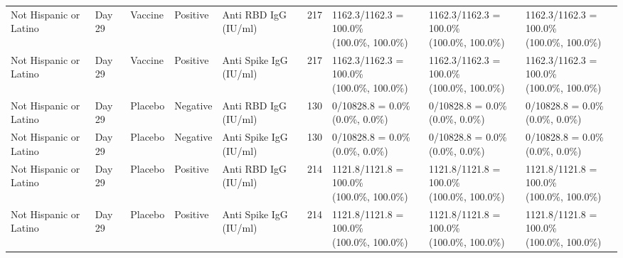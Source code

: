 \documentclass[]{book}
\theoremstyle{definition}
\theoremstyle{definition}
\theoremstyle{definition}
\newcommand{\1}{\mathbbm{1}}
\begin{document}
\begin{landscape}
\begin{ThreePartTable}
\begin{longtable}[t]{>{\raggedright\arraybackslash}p{2.7cm}llllllll}
\hspace{1em}Not Hispanic or Latino & Day 29 & Vaccine & Positive & Anti RBD IgG (IU/ml) & 217 & \makecell[l]{1162.3/1162.3 = 100.0\%\\(100.0\%, 100.0\%)} & \makecell[l]{1162.3/1162.3 = 100.0\%\\(100.0\%, 100.0\%)} & \makecell[l]{1162.3/1162.3 = 100.0\%\\(100.0\%, 100.0\%)}\\
\hspace{1em}Not Hispanic or Latino & Day 29 & Vaccine & Positive & Anti Spike IgG (IU/ml) & 217 & \makecell[l]{1162.3/1162.3 = 100.0\%\\(100.0\%, 100.0\%)} & \makecell[l]{1162.3/1162.3 = 100.0\%\\(100.0\%, 100.0\%)} & \makecell[l]{1162.3/1162.3 = 100.0\%\\(100.0\%, 100.0\%)}\\
\hspace{1em}Not Hispanic or Latino & Day 29 & Placebo & Negative & Anti RBD IgG (IU/ml) & 130 & \makecell[l]{0/10828.8 = 0.0\%\\(0.0\%, 0.0\%)} & \makecell[l]{0/10828.8 = 0.0\%\\(0.0\%, 0.0\%)} & \makecell[l]{0/10828.8 = 0.0\%\\(0.0\%, 0.0\%)}\\
\hspace{1em}Not Hispanic or Latino & Day 29 & Placebo & Negative & Anti Spike IgG (IU/ml) & 130 & \makecell[l]{0/10828.8 = 0.0\%\\(0.0\%, 0.0\%)} & \makecell[l]{0/10828.8 = 0.0\%\\(0.0\%, 0.0\%)} & \makecell[l]{0/10828.8 = 0.0\%\\(0.0\%, 0.0\%)}\\
\hspace{1em}Not Hispanic or Latino & Day 29 & Placebo & Positive & Anti RBD IgG (IU/ml) & 214 & \makecell[l]{1121.8/1121.8 = 100.0\%\\(100.0\%, 100.0\%)} & \makecell[l]{1121.8/1121.8 = 100.0\%\\(100.0\%, 100.0\%)} & \makecell[l]{1121.8/1121.8 = 100.0\%\\(100.0\%, 100.0\%)}\\
\hspace{1em}Not Hispanic or Latino & Day 29 & Placebo & Positive & Anti Spike IgG (IU/ml) & 214 & \makecell[l]{1121.8/1121.8 = 100.0\%\\(100.0\%, 100.0\%)} & \makecell[l]{1121.8/1121.8 = 100.0\%\\(100.0\%, 100.0\%)} & \makecell[l]{1121.8/1121.8 = 100.0\%\\(100.0\%, 100.0\%)}\\

\end{longtable}
\end{ThreePartTable}
\end{landscape}
\end{document}
